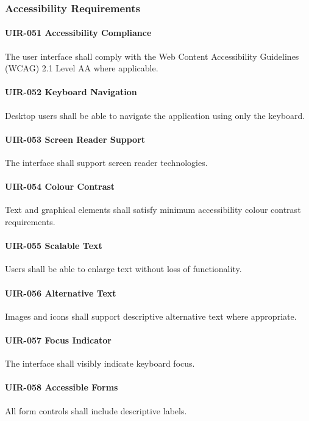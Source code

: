 \subsubsection*{Accessibility Requirements}

\paragraph{UIR-051 Accessibility Compliance}
The user interface shall comply with the Web Content Accessibility
Guidelines (WCAG) 2.1 Level AA where applicable.

\paragraph{UIR-052 Keyboard Navigation}
Desktop users shall be able to navigate the application using only the
keyboard.

\paragraph{UIR-053 Screen Reader Support}
The interface shall support screen reader technologies.

\paragraph{UIR-054 Colour Contrast}
Text and graphical elements shall satisfy minimum accessibility colour
contrast requirements.

\paragraph{UIR-055 Scalable Text}
Users shall be able to enlarge text without loss of functionality.

\paragraph{UIR-056 Alternative Text}
Images and icons shall support descriptive alternative text where
appropriate.

\paragraph{UIR-057 Focus Indicator}
The interface shall visibly indicate keyboard focus.

\paragraph{UIR-058 Accessible Forms}
All form controls shall include descriptive labels.

